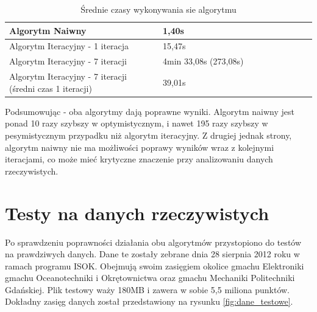 \begin{table}[h!]
    \centering
    \begin{tabular}{|p{0.5\linewidth}|p{0.5\linewidth}|}
        \hline
        Algorytm Naiwny & 1,40s \\
        \hline
        Algorytm Iteracyjny - 1 iteracja & 15,47s \\
        \hline
        Algorytm Iteracyjny - 7 iteracji & 4min 33,08s (273,08s) \\
        \hline
        Algorytm Iteracyjny - 7 iteracji (średni czas 1 iteracji) & 39,01s \\
        \hline
    \end{tabular}
    \caption{Średnie czasy wykonywania sie algorytmu}
    \label{tab:czasy1}
\end{table}

Podsumowując - oba algorytmy dają poprawne wyniki. Algorytm naiwny jest ponad 10 razy szybszy w optymistycznym,
i nawet 195 razy szybszy w pesymistycznym przypadku niż algorytm iteracyjny. Z drugiej jednak strony, algorytm
naiwny nie ma możliwości poprawy wyników wraz z kolejnymi iteracjami, co może mieć krytyczne znaczenie przy
analizowaniu danych rzeczywistych.

\section{Testy na danych rzeczywistych}

Po sprawdzeniu poprawności działania obu algorytmów przystopiono do testów na prawdziwych danych.
Dane te zostały zebrane dnia 28 sierpnia 2012 roku w ramach programu ISOK. Obejmują swoim zasięgiem okolice
gmachu Elektroniki gmachu Oceanotechniki i Okrętownictwa oraz gmachu Mechaniki Politechniki Gdańskiej.
Plik testowy waży 180MB i zawera w sobie 5,5 miliona punktów.
Dokładny zasięg danych został przedstawiony na rysunku \ref{fig:dane_testowe}.

